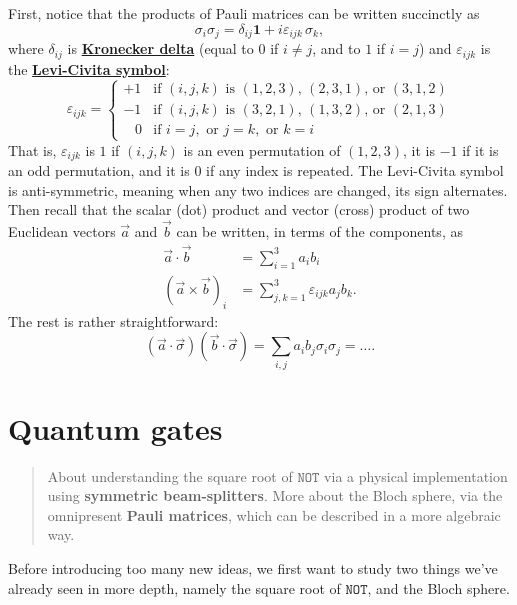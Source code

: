 \documentclass[fleqn]{article}
\let\oldsection\section
\renewcommand\section{\clearpage\oldsection}
\begin{document}
First, notice that the products of Pauli matrices can be written succinctly as
\[
 \sigma_{i}\sigma_{j}
 = \delta _{ij}\mathbf{1}+ i\varepsilon_{ijk}\,\sigma _{k},
\]
where \(\delta_{ij}\) is \href{https://en.wikipedia.org/wiki/Kronecker_delta}{\textbf{Kronecker delta}} (equal to \(0\) if \(i\neq j\), and to \(1\) if \(i=j\)) and \(\varepsilon_{ijk}\) is the \href{https://en.wikipedia.org/wiki/Levi-Civita_symbol\#Three_dimensions}{\textbf{Levi-Civita symbol}}:
\[
 \varepsilon_{ijk}
 = \begin{cases}
  +1 & {\text{if }}(i,j,k){\text{ is }}(1,2,3)\text{, }(2,3,1){\text{, or }}(3,1,2)
\\-1 & {\text{if }}(i,j,k){\text{ is }}(3,2,1)\text{, }(1,3,2){\text{, or }}(2,1,3)
\\\;\;\;0 & {\text{if }}i=j,{\text{ or }}j=k,{\text{ or }}k=i
\end{cases}
\]
That is, \(\varepsilon _{ijk}\) is \(1\) if \((i, j, k)\) is an even permutation of \((1, 2, 3)\), it is \(-1\) if it is an odd permutation, and it is \(0\) if any index is repeated.
The Levi-Civita symbol is anti-symmetric, meaning when any two indices are changed, its sign alternates.
Then recall that the scalar (dot) product and vector (cross) product of two Euclidean vectors \(\vec{a}\) and \(\vec{b}\) can be written, in terms of the components, as
\[
  \begin{aligned}
    \vec{a}\cdot\vec{b}
    &= \sum_{i=1}^3 a_i b_i
  \\(\vec{a}\times\vec{b})_i
    &= \sum_{j,k=1}^3 \varepsilon_{ijk}a_jb_k.
  \end{aligned}
\]
The rest is rather straightforward:
\[
  (\vec{a}\cdot\vec{\sigma})(\vec{b}\cdot\vec{\sigma})
  = \sum_{i,j}a_i b_j\sigma_i\sigma_j
  = \ldots.
\]

\hypertarget{quantum-gates}{%
\section{Quantum gates}\label{quantum-gates}}

\begin{quote}
About understanding the square root of \(\texttt{NOT}\) via a physical implementation using \textbf{symmetric beam-splitters}.
More about the Bloch sphere, via the omnipresent \textbf{Pauli matrices}, which can be described in a more algebraic way.
\end{quote}

Before introducing too many new ideas, we first want to study two things we've already seen in more depth, namely the square root of \(\texttt{NOT}\), and the Bloch sphere.
\end{document}
